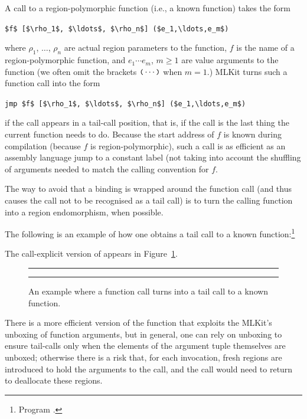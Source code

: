 \documentclass[12pt]{book}
\begin{document}
A call to a
%
%
%
region-polymorphic function (i.e., a known function) takes the form
\begin{center}
  \lstinline!$f$ [$\rho_1$, $\ldots$, $\rho_n$] ($e_1,\ldots,e_m$)!
\end{center}
where $\rho_1$, $\ldots$, $\rho_n$ are actual region parameters to the function,
$f$ is the name of a region-polymorphic function, and $e_1 \cdots e_m$, $m \geq
1$ are value arguments to the function (we often omit the brackets $\mbox{\small\ttfamily(}
\cdots \mbox{\small\ttfamily)}$ when $m = 1$.) MLKit turns such a function call into the form
\begin{center}
  \lstinline!jmp $f$ [$\rho_1$, $\ldots$, $\rho_n$] ($e_1,\ldots,e_m$)!
\end{center}
if the call appears in a tail-call position, that is, if the call is the last
thing the current function needs to do.  Because the start address of $f$ is
known during compilation (because $f$ is region-polymorphic), such a call is as
efficient as an assembly language jump to a constant label (not taking into
account the shuffling of arguments needed to match the calling convention for
$f$.

The way to avoid that a  binding is wrapped around the function call
(and thus causes the call not to be recognised as a tail call) is to turn the
calling function into a region endomorphism, when possible.

The following is an example of how one obtains a tail call to a known
function:\footnote{Program .}
The call-explicit version of  appears in Figure~\ref{tail.fig}.
\begin{figure}
\hrule \medskip
{}
\caption{An example where a function call turns into a tail call to a known
  function.}
\medskip \hrule
\label{tail.fig}
\end{figure}

There is a more efficient version of the function  that exploits the
MLKit's unboxing of function arguments, but in general, one can rely on unboxing
to ensure tail-calls only when the elements of the argument tuple themselves are
unboxed; otherwise there is a risk that, for each invocation, fresh regions are
introduced to hold the arguments to the call, and the call would need to return
to deallocate these regions.
\end{document}
